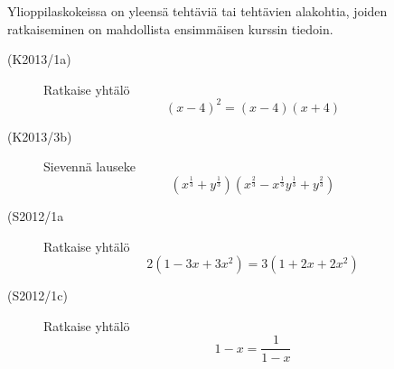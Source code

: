 Ylioppilaskokeissa on yleensä tehtäviä tai tehtävien alakohtia, joiden ratkaiseminen on mahdollista ensimmäisen kurssin tiedoin.



\begin{description}
	\item[(K2013/1a)]  Ratkaise yhtälö
						\[(x-4)^2=(x-4)(x+4)\]
	\item[(K2013/3b)]  Sievennä lauseke 
						\[(x^\frac{1}{3} + y^\frac{1}{3})(x^\frac{2}{3} - x^\frac{1}{3}y^\frac{1}{3} + y^\frac{2}{3})\]
						
	\item[(S2012/1a]   Ratkaise yhtälö
						\[2(1-3x+3x^2)=3(1+2x+2x^2)\]
	\item[(S2012/1c)]  Ratkaise yhtälö
						\[1-x=\frac{1}{1-x}\]


\end{description}
